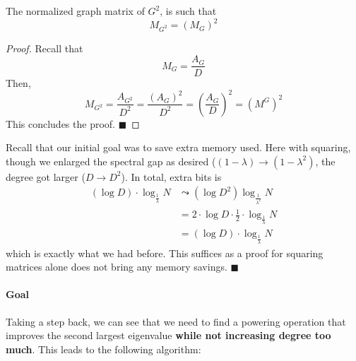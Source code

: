 \documentclass[11pt, letter]{book}
\newcommand{\qed}{\hfill $\blacksquare$}
\begin{document}
\begin{proposition}
	The normalized graph matrix of $G^2$, is such that
	\begin{equation}
		M_{G^2} = \left ( M_G \right ) ^2
	\end{equation}
\end{proposition}

\begin{proof}
	Recall that 
	\begin{equation}
		M_G = \frac{A_G}{D}
	\end{equation}
	Then, 
	\begin{equation}
		M_{G^2} = \frac{A_{G^2}}{D^2} = \frac{(A_G)^2}{D^2} = \left( \frac{A_G}{D} \right) ^2 = (M^G) ^2
	\end{equation}
	This concludes the proof. \qed
\end{proof}

\begin{proposition}
	Recall that our initial goal was to save extra memory used. Here with squaring, though we enlarged the spectral gap as desired ($(1 - \lambda) \rightarrow (1 - \lambda^2) $, the degree got larger ($D \rightarrow D^2$). In total, extra bits is
	\begin{align}
		\left ( \log D \right ) \cdot \log_{\frac{1}{\lambda}} N
		&\leadsto \left( \log D^2 \right) \log _{\frac{1}{\lambda^2}} N \\
		&= 2 \cdot \log D \cdot \frac{1}{2} \cdot \log _{\frac{1}{\lambda}} N \\
		&= \left ( \log D \right ) \cdot \log_{\frac{1}{\lambda}} N
	\end{align}
	which is exactly what we had before. This suffices as a proof for squaring matrices alone does not bring any memory savings. \qed
\end{proposition}

\paragraph{Goal} Taking a step back, we can see that we need to find a powering operation that improves the second largest eigenvalue \textbf{while not increasing degree too much}. This leads to the following algorithm:
\end{document}
